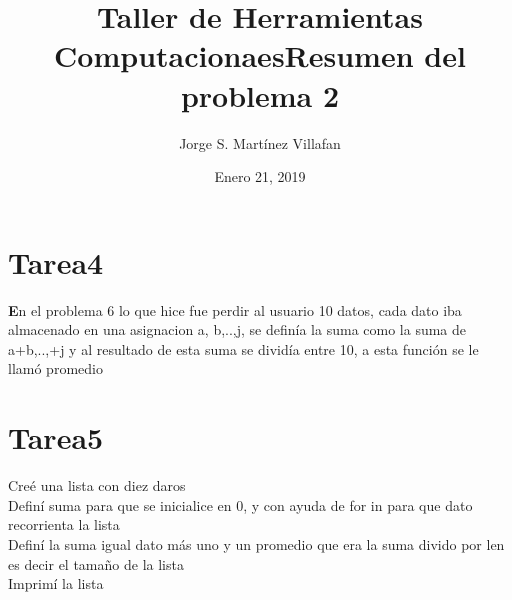 \documentclass[letterpaper, 12pt, oneside]{article}%
\title{\Huge Taller de Herramientas Computacionaes}
\author{Jorge S. Martínez Villafan}
\date{Enero 21, 2019}
\begin{document}
\maketitle
\newpage
\title{Resumen del problema 2}
\section{Tarea4}
\textbf En el problema 6 lo que hice fue perdir al usuario 10 datos, cada dato iba almacenado en una asignacion a, b,..,j, se definía la suma como la suma de a+b,..,+j y al resultado de esta suma se dividía entre 10, a esta función se le llamó promedio 
\section{Tarea5}
Creé una lista con diez daros\\
Definí \color{red} suma \color{black} para que se inicialice en 0, y con ayuda de \color{blue} for in \color{black} para que \color{blue} dato \color{black} recorrienta la lista\\
Definí la suma igual dato más uno y un promedio que era la suma divido por \color{blue} len \color{black} es decir el tamaño de la lista\\
Imprimí la lista 
\end{document}
